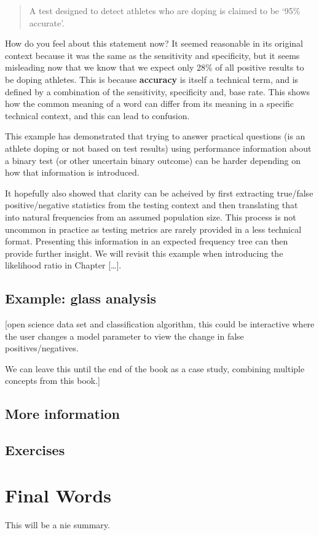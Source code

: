 \documentclass[
]{book}
\begin{document}
\begin{quote}
A test designed to detect athletes who are doping is claimed to be `95\% accurate'.
\end{quote}

How do you feel about this statement now? It seemed reasonable in its original context because it was the same as the sensitivity and specificity, but it seems misleading now that we know that we expect only 28\% of all positive results to be doping athletes. This is because \textbf{accuracy} is itself a technical term, and is defined by a combination of the sensitivity, specificity and, base rate. This shows how the common meaning of a word can differ from its meaning in a specific technical context, and this can lead to confusion.

This example has demonstrated that trying to answer practical questions (is an athlete doping or not based on test results) using performance information about a binary test (or other uncertain binary outcome) can be harder depending on how that information is introduced.

It hopefully also showed that clarity can be acheived by first extracting true/false positive/negative statistics from the testing context and then translating that into natural frequencies from an assumed population size. This process is not uncommon in practice as testing metrics are rarely provided in a less technical format. Presenting this information in an expected frequency tree can then provide further insight. We will revisit this example when introducing the likelihood ratio in Chapter {[}\ldots{]}.

\hypertarget{example-glass-analysis}{%
\section{Example: glass analysis}\label{example-glass-analysis}}

{[}open science data set and classification algorithm, this could be interactive where the user changes a model parameter to view the change in false positives/negatives.

We can leave this until the end of the book as a case study, combining multiple concepts from this book.{]}

\hypertarget{more-information}{%
\section{More information}\label{more-information}}

\hypertarget{exercises}{%
\section{Exercises}\label{exercises}}

\hypertarget{final-words}{%
\chapter{Final Words}\label{final-words}}

This will be a nie summary.

  
\end{document}
